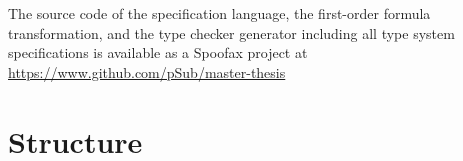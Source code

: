 The source code of the specification language, the first-order formula
transformation, and the type checker generator including all type
system specifications is available as a Spoofax project at
\url{https://www.github.com/pSub/master-thesis}

\section{Structure}



